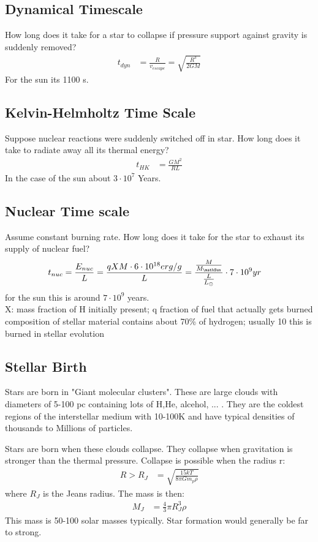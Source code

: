 \documentclass[11pt,a4paper]{article}
\begin{document}
\subsection{Dynamical Timescale}
How long does it take for a star to collapse if pressure support against gravity is suddenly removed?
\begin{align*}
    t_{dyn} &= \frac {R} {v_{escape}} = \sqrt{\frac {R^3}{2GM}}
\end{align*}
For the sun its 1100 s.
\subsection{Kelvin-Helmholtz Time Scale}
Suppose nuclear reactions were suddenly switched off in star. How long does it
take to radiate away all its thermal energy?
\begin{align*}
t_{HK} &= \frac {GM^2}{RL} 
\end{align*}
In the case of the sun about $3 \cdot 10 ^7$ Years.
\subsection{Nuclear Time scale}
Assume constant burning rate. How long does it take for the star to exhaust its
supply of nuclear fuel?
\begin{align*}
    t_{nuc} &= \frac {E_{nuc} }{L} = \frac {qXM \cdot 6 \cdot 10^{18} erg/g}{L} = \frac {\frac M {M_\mathSun}}  {\frac {L}{L_\odot}} \cdot 7 \cdot 10^9 yr
\end{align*}
for the sun this is around $ 7 \cdot 10 ^9 $ years. \\
X: mass fraction of H initially present; q fraction of fuel that actually gets burned
composition of stellar material contains about 70\% of hydrogen; usually 10%
this is burned in stellar evolution
\subsection{Stellar Birth}
Stars are born in "Giant molecular clusters".
These are large clouds with diameters of 5-100 pc containing lots of H,He, alcehol, ... . 
They are the coldest regions of the interstellar medium with 10-100K and have typical densities of thousands to Millions of particles.

Stars are born when these clouds collapse.
They collapse when gravitation is stronger than the thermal pressure. 
Collapse is possible when the radius r: 
\begin{align*}
    R > R_J &= \sqrt{\frac{15kT}{8 \pi Gm_p \rho}} 
\end{align*}
where $R_J$ is the Jeans radius.
The mass is then: 
\begin{align*}
    M_J &= \frac {4}{3} \pi R^3_J \rho 
\end{align*}
This mass is 50-100 solar masses typically. 
Star formation would generally be far to strong.
\end{document}
